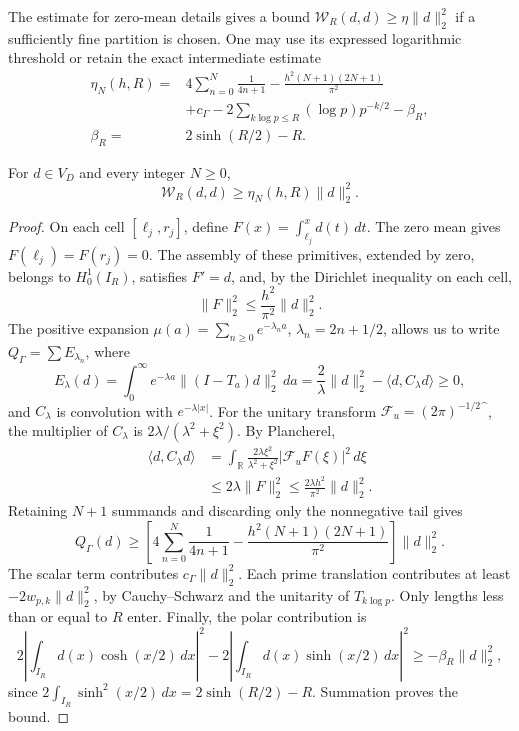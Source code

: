 The estimate for zero-mean details gives a bound \(\mathscr W_R(d,d)\geq\eta\|d\|_2^2\)
if a sufficiently fine partition is chosen. One may use its
expressed logarithmic threshold or retain the exact intermediate estimate
\begin{equation}
\begin{aligned}
\eta_N(h,R)={}&4\sum_{n=0}^N\frac1{4n+1}
-\frac{h^2(N+1)(2N+1)}{\pi^2}\\
&+c_\Gamma-2\sum_{k\log p\leq R}(\log p)p^{-k/2}-\beta_R,\\
\beta_R={}&2\sinh(R/2)-R.
\end{aligned}
\label{schur-add-eq-S1}
\end{equation}
\begin{lemma}
\label{schur-add-retencion-detalles}
For \(d\in V_D\) and every integer \(N\geq0\),
\[
\mathscr W_R(d,d)\geq\eta_N(h,R)\|d\|_2^2.
\]
\end{lemma}
\begin{proof}
On each cell \([\ell_j,r_j]\), define
\(F(x)=\int_{\ell_j}^x d(t)\,dt\). The zero mean gives
\(F(\ell_j)=F(r_j)=0\). The assembly of these primitives, extended
by zero, belongs to \(H_0^1(I_R)\), satisfies \(F'=d\), and, by
the Dirichlet inequality on each cell,
\begin{equation}
\|F\|_2^2\leq\frac{h^2}{\pi^2}\|d\|_2^2.
\label{schur-add-primitiva}
\end{equation}
The positive expansion
\(\mu(a)=\sum_{n\geq0}e^{-\lambda_n a}\), \(\lambda_n=2n+1/2\),
allows us to write \(Q_\Gamma=\sum E_{\lambda_n}\), where
\begin{equation}
E_\lambda(d)=\int_0^\infty e^{-\lambda a}
 \|(I-T_a)d\|_2^2\,da
 =\frac2\lambda\|d\|_2^2-\langle d,C_\lambda d\rangle\geq0,
\label{schur-add-energia-lambda}
\end{equation}
and \(C_\lambda\) is convolution with \(e^{-\lambda|x|}\).
For the unitary transform
\(\mathcal F_u=(2\pi)^{-1/2}\widehat{\phantom f}\), the multiplier
of \(C_\lambda\) is \(2\lambda/(\lambda^2+\xi^2)\). By Plancherel,
\begin{equation}
\begin{aligned}
\langle d,C_\lambda d\rangle
&=\int_{\mathbb R}\frac{2\lambda\xi^2}{\lambda^2+\xi^2}
 |\mathcal F_uF(\xi)|^2\,d\xi\\
&\leq2\lambda\|F\|_2^2
 \leq\frac{2\lambda h^2}{\pi^2}\|d\|_2^2 .
\end{aligned}
\label{schur-add-cota-convolucion}
\end{equation}
Retaining \(N+1\) summands and discarding only the nonnegative tail gives
\[
Q_\Gamma(d)\geq
\left[4\sum_{n=0}^N\frac1{4n+1}
-\frac{h^2(N+1)(2N+1)}{\pi^2}\right]\|d\|_2^2.
\]
The scalar term contributes \(c_\Gamma\|d\|_2^2\).
Each prime translation contributes at least
\(-2w_{p,k}\|d\|_2^2\), by Cauchy--Schwarz and the unitarity
of \(T_{k\log p}\). Only lengths less than or equal to
\(R\) enter.
Finally, the polar contribution is
\[
2\left|\int_{I_R}d(x)\cosh(x/2)\,dx\right|^2
-2\left|\int_{I_R}d(x)\sinh(x/2)\,dx\right|^2
\geq-\beta_R\|d\|_2^2,
\]
since \(2\int_{I_R}\sinh^2(x/2)\,dx=2\sinh(R/2)-R\).
Summation proves the bound.
\end{proof}
